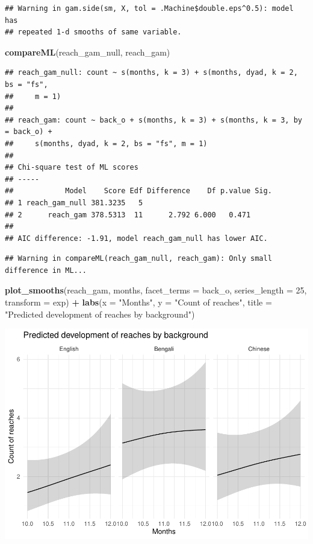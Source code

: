 \documentclass[]{article}
\newenvironment{Shaded}{\begin{snugshade}}{\end{snugshade}}
\newcommand{\DataTypeTok}[1]{\textcolor[rgb]{0.13,0.29,0.53}{#1}}
\newcommand{\DecValTok}[1]{\textcolor[rgb]{0.00,0.00,0.81}{#1}}
\newcommand{\KeywordTok}[1]{\textcolor[rgb]{0.13,0.29,0.53}{\textbf{#1}}}
\newcommand{\NormalTok}[1]{#1}
\newcommand{\OperatorTok}[1]{\textcolor[rgb]{0.81,0.36,0.00}{\textbf{#1}}}
\newcommand{\StringTok}[1]{\textcolor[rgb]{0.31,0.60,0.02}{#1}}
\begin{document}
\begin{verbatim}
## Warning in gam.side(sm, X, tol = .Machine$double.eps^0.5): model has
## repeated 1-d smooths of same variable.
\end{verbatim}

\begin{Shaded}
\begin{Highlighting}[]
\KeywordTok{compareML}\NormalTok{(reach_gam_null, reach_gam)}
\end{Highlighting}
\end{Shaded}

\begin{verbatim}
## reach_gam_null: count ~ s(months, k = 3) + s(months, dyad, k = 2, bs = "fs", 
##     m = 1)
## 
## reach_gam: count ~ back_o + s(months, k = 3) + s(months, k = 3, by = back_o) + 
##     s(months, dyad, k = 2, bs = "fs", m = 1)
## 
## Chi-square test of ML scores
## -----
##            Model    Score Edf Difference    Df p.value Sig.
## 1 reach_gam_null 381.3235   5                              
## 2      reach_gam 378.5313  11      2.792 6.000   0.471     
## 
## AIC difference: -1.91, model reach_gam_null has lower AIC.
\end{verbatim}

\begin{verbatim}
## Warning in compareML(reach_gam_null, reach_gam): Only small difference in ML...
\end{verbatim}

\begin{Shaded}
\begin{Highlighting}[]
\KeywordTok{plot_smooths}\NormalTok{(reach_gam, months, }\DataTypeTok{facet_terms =}\NormalTok{ back_o, }\DataTypeTok{series_length =} \DecValTok{25}\NormalTok{, }\DataTypeTok{transform =}\NormalTok{ exp) }\OperatorTok{+}
\StringTok{  }\KeywordTok{labs}\NormalTok{(}\DataTypeTok{x =} \StringTok{"Months"}\NormalTok{, }\DataTypeTok{y =} \StringTok{"Count of reaches"}\NormalTok{, }\DataTypeTok{title =} \StringTok{"Predicted development of reaches by background"}\NormalTok{)}
\end{Highlighting}
\end{Shaded}

\includegraphics{supplement_files/figure-latex/reach-gam-plot-1.pdf}
\end{document}
